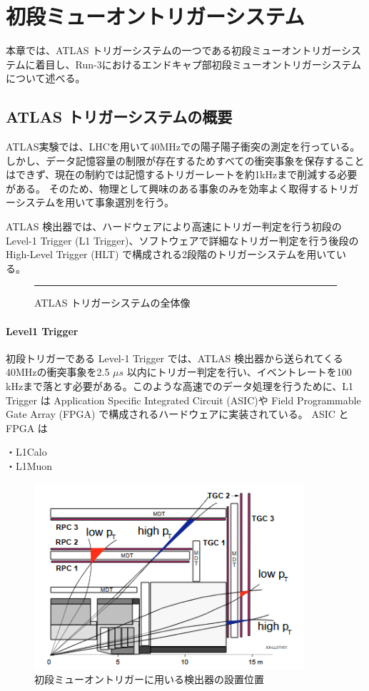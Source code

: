 \chapter{初段ミューオントリガーシステム}
本章では、ATLAS トリガーシステムの一つである初段ミューオントリガーシステムに着目し、Run-3におけるエンドキャプ部初段ミューオントリガーシステムについて述べる。

\section{ATLAS トリガーシステムの概要}
ATLAS実験では、LHCを用いて40MHzでの陽子陽子衝突の測定を行っている。しかし、データ記憶容量の制限が存在するためすべての衝突事象を保存することはできず、現在の制約では記憶するトリガーレートを約1kHzまで削減する必要がある。
そのため、物理として興味のある事象のみを効率よく取得するトリガーシステムを用いて事象選別を行う。

ATLAS 検出器では、ハードウェアにより高速にトリガー判定を行う初段の Level-1 Trigger (L1 Trigger)、ソフトウェアで詳細なトリガー判定を行う後段の High-Level Trigger (HLT) で構成される2段階のトリガーシステムを用いている。

\begin{figure}[tb]
  \centering
  \rule{8cm}{6cm}
  \caption{ATLAS トリガーシステムの全体像}
  \label{fig:fit_def}
\end{figure}

\subsubsection{Level1 Trigger}
初段トリガーである Level-1 Trigger では、ATLAS 検出器から送られてくる40MHzの衝突事象を2.5 $\mu s$ 以内にトリガー判定を行い、イベントレートを100 kHzまで落とす必要がある。このような高速でのデータ処理を行うために、L1 Trigger は Application Specific Integrated Circuit (ASIC)や Field Programmable Gate Array (FPGA) で構成されるハードウェアに実装されている。
ASIC と FPGA は




・L1Calo\\
・L1Muon\\
\begin{figure}[tb]
  \centering
  \includegraphics[clip, width=10cm]{fig/3/muon_trigger_overview.png}
  \caption{初段ミューオントリガーに用いる検出器の設置位置}
  \label{fig:muon}
\end{figure}

